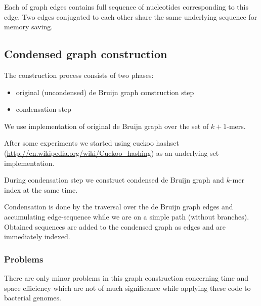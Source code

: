 \documentclass[12pt]{article}
\newcommand{\dbg}{de Bruijn graph}
\begin{document}

Each of graph edges contains full sequence of nucleotides corresponding to this edge. Two edges conjugated to each other share the same underlying sequence for memory saving.

\subsection{Condensed graph construction}
The construction process consists of two phases:
\begin{itemize}
\item original (uncondensed) \dbg{} construction step
\item condensation step
\end{itemize}

We use implementation of original \dbg{} over the set of $k+1$-mers. 

After some experiments we started using cuckoo hashset (\url{http://en.wikipedia.org/wiki/Cuckoo_hashing}) as an underlying set implementation.

During condensation step we construct condensed \dbg{} and $k$-mer index at the same time.

Condensation is done by the traversal over the \dbg{} edges and accumulating edge-sequence while we are on a simple path (without branches). Obtained sequences are added to the condensed graph as edges and are immediately indexed.


\subsubsection{Problems}
There are only minor problems in this graph construction concerning time and space efficiency which are not of much significance while applying these code to bacterial genomes. %
\end{document}
